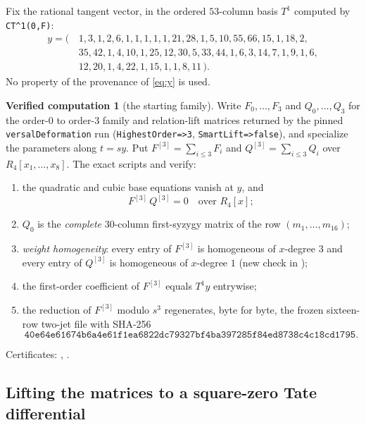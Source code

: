 \documentclass[11pt]{article}
\theoremstyle{definition}
\newtheorem{computation}[theorem]{Verified computation}
\theoremstyle{remark}
\begin{document}
Fix the rational tangent vector, in the ordered $53$-column basis
$T^1$ computed by \texttt{CT\^{}1(0,F)}:
\[
\begin{split}
y=(\,&1,3,1,2,6,1,1,1,1,1,21,28,1,5,10,55,66,15,1,18,2,\\
&35,42,1,4,10,1,25,12,30,5,33,44,1,6,3,14,7,1,9,1,6,\\
&12,20,1,4,22,1,15,1,1,8,11\,).
\end{split}
\tag{4.1}\label{eq:y}
\]
No property of the provenance of \eqref{eq:y} is used.

\begin{computation}[the starting family]\label{comp:start}
Write $F_0,\ldots,F_3$ and $Q_0,\ldots,Q_3$ for the order-$0$ to order-$3$
family and relation-lift matrices returned by the pinned
\texttt{versalDeformation} run (\texttt{HighestOrder=>3},
\texttt{SmartLift=>false}), and specialize the parameters along $t=sy$.  Put
$F^{[3]}=\sum_{i\le3}F_i$ and $Q^{[3]}=\sum_{i\le3}Q_i$ over
$R_4[x_1,\ldots,x_8]$.  The exact scripts
 and
 verify:
\begin{enumerate}
\item the quadratic and cubic base equations vanish at $y$, and
\[
 F^{[3]}\,Q^{[3]}=0 \quad\text{over } R_4[x];
\tag{4.2}\label{eq:fq}
\]
\item $Q_0$ is the \emph{complete} $30$-column first-syzygy matrix of the
row $(m_1,\ldots,m_{16})$;
\item \emph{weight homogeneity}: every entry of $F^{[3]}$ is homogeneous of
$x$-degree $3$ and every entry of $Q^{[3]}$ is homogeneous of $x$-degree
$1$ (new check in );
\item the first-order coefficient of $F^{[3]}$ equals $T^1y$ entrywise;
\item the reduction of $F^{[3]}$ modulo $s^3$ regenerates, byte for byte,
the frozen sixteen-row two-jet file with SHA-256
\[
\texttt{40e64e61674b6a4e61f1ea6822dc79327bf4ba397285f84ed8738c4c18cd1795}.
\]
\end{enumerate}
Certificates: ,
.
\end{computation}

\subsection{Lifting the matrices to a square-zero Tate differential}
\end{document}
